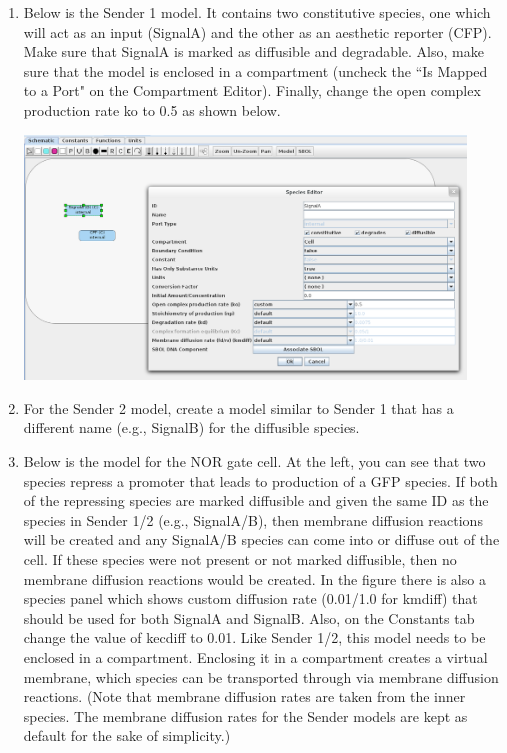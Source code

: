 \documentclass[titlepage,11pt]{article}
\begin{document}
\begin{enumerate}

\item Below is the Sender 1 model.  It contains two constitutive species, one which will act as an input (SignalA) and the other as an aesthetic reporter (CFP).  Make sure that SignalA is marked as diffusible and degradable. Also, make sure that the model is enclosed in a compartment (uncheck the ``Is Mapped to a Port" on the Compartment Editor). Finally, change the open complex production rate ko to 0.5 as shown below. 

\includegraphics[height=65mm]{screenshots/newgrid/sender1}

\item For the Sender 2 model, create a model similar to Sender 1 that has a different name (e.g., SignalB) for the diffusible species.

\item Below is the model for the NOR gate cell.  At the left, you can see that two species repress a promoter that leads to production of a GFP species.  If both of the repressing species are marked diffusible and given the same ID as the species in Sender 1/2 (e.g., SignalA/B), then membrane diffusion reactions will be created and any SignalA/B species can come into or diffuse out of the cell.  If these species were not present or not marked diffusible, then no membrane diffusion reactions would be created.  In the figure there is also a species panel which shows custom diffusion rate (0.01/1.0 for kmdiff) that should be used for both SignalA and SignalB.  Also, on the Constants tab change the value of kecdiff to 0.01.  Like Sender 1/2, this model needs to be enclosed in a compartment.  Enclosing it in a compartment creates a virtual membrane, which species can be transported through via membrane diffusion reactions.  (Note that membrane diffusion rates are taken from the inner species.  The membrane diffusion rates for the Sender models are kept as default for the sake of simplicity.)


\end{enumerate}
\end{document}
